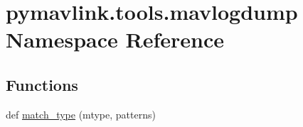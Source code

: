\hypertarget{namespacepymavlink_1_1tools_1_1mavlogdump}{}\section{pymavlink.\+tools.\+mavlogdump Namespace Reference}
\label{namespacepymavlink_1_1tools_1_1mavlogdump}
\subsection*{Functions}
\begin{DoxyCompactItemize}
\item 
def \mbox{\hyperlink{namespacepymavlink_1_1tools_1_1mavlogdump_a6d6e4b627922cd7882784716f7f8db1f}{match\+\_\+type}} (mtype, patterns)
\end{DoxyCompactItemize}

